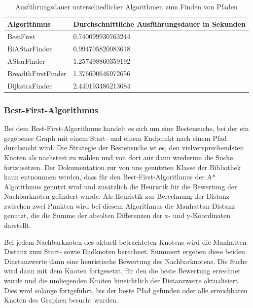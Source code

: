\begin{table}[htb]
    \centering
    \begin{tabular}{|l|l|}
        \hline
            \textbf{Algorithmus} & {\textbf{Durchschnittliche Ausführungsdauer in Sekunden}} \\ \hline
            BestFirst 		    & 0.740099930763244 \\ \hline
            BiAStarFinder 		& 0.994705820083618 \\ \hline
            AStarFinder 		& 1.257498860359192 \\ \hline
            BreadthFirstFinder  & 1.376600646972656 \\ \hline
            DijkstraFinder		& 2.440193486213684 \\ \hline
    \end{tabular}
    \caption{Ausführungsdauer unterschiedlicher Algorithmen zum Finden von Pfaden}
    \label{tab:ausfuehrungsdauer-pfadalgorithmen}
\end{table}

\subsubsection*{Best-First-Algorithmus}
\label{subsubsec:best-first-algorithm}

Bei dem Best-First-Algorithmus handelt es sich um eine Bestensuche, bei der ein gegebener Graph mit einem Start- und
einem Endpunkt nach einem Pfad durchsucht wird.
Die Strategie der Bestensuche ist es, den vielversprechendsten Knoten als nächstest zu wählen und von dort aus dann
wiederum die Suche fortzusetzen.
Der Dokumentation zur von uns genutzten Klasse  der Bibliothek  kann entnommen werden,
dass für den Best-First-Algorithmus der A* Algorithmus genutzt wird und zusätzlich die Heuristik für die Bewertung der
Nachbarknoten geändert wurde.
Als Heuristik zur Berechnung der Distanz zwischen zwei Punkten wird bei diesem Algorithmus die Manhattan-Distanz
genutzt, die die Summe der absolten Differenzen der x- und y-Koordinaten darstellt. 

Bei jedem Nachbarknoten des aktuell betrachteten Knotens wird die Manhatten-Distanz zum Start- sowie Endknoten
berechnet.
Summiert ergeben diese beiden Dinstanzwerte dann eine heuristische Bewertung des Nachbarknotens.
Die Suche wird dann mit dem Knoten fortgesetzt, für den die beste Bewertung errechnet wurde und die umliegenden Knoten
hinsichtlich der Distanzwerte aktualisiert.
Dies wird solange fortgeführt, bis der beste Pfad gefunden oder alle erreichbaren Knoten des Graphen besucht wurden.

